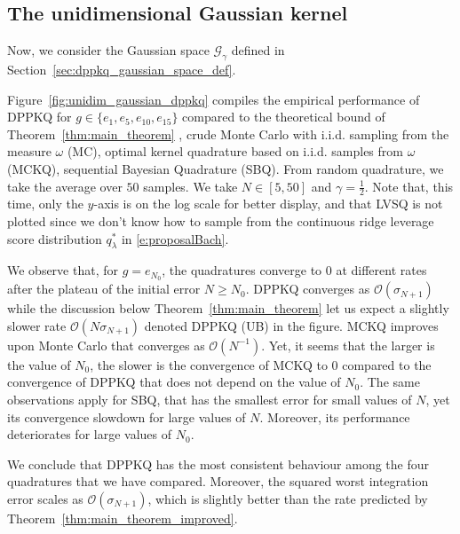 \documentclass[twoside,11pt]{book}
\numberwithin{theorem}{chapter}
\numberwithin{definition}{chapter}
\numberwithin{proposition}{chapter}
\numberwithin{corollary}{chapter}
\numberwithin{example}{chapter}
\numberwithin{lemma}{chapter}
\numberwithin{assumption}{chapter}
\numberwithin{equation}{chapter}
\numberwithin{figure}{chapter}
\newcommand{\rb}[1]{\textcolor{magenta}{#1}}
\begin{document}
\subsection{The unidimensional Gaussian kernel}\label{s:gaussian_numsim}
Now, we consider the Gaussian space $\mathcal{G}_{\gamma}$ defined in Section~\ref{sec:dppkq_gaussian_space_def}.

Figure~\ref{fig:unidim_gaussian_dppkq} compiles the empirical performance of DPPKQ for $g \in \{e_{1},e_{5},e_{10},e_{15}\}$ compared to the theoretical bound of Theorem~\ref{thm:main_theorem} , crude Monte Carlo with i.i.d. sampling from the measure $\omega$ (MC), optimal kernel quadrature based on i.i.d. samples from $\omega$ (MCKQ), sequential Bayesian Quadrature (SBQ). From random quadrature, we take the average over $50$ samples.
We take $N \in [5,50]$ and $\gamma = \frac{1}{2}$. Note that, this time, only the $y$-axis is on the log scale for better display, and that LVSQ is not plotted since we don't know how to sample from the continuous ridge leverage score distribution $q_\lambda^{*}$ in \eqref{e:proposalBach}.
%

We observe that, for $g = e_{N_{0}}$, the quadratures converge to $0$ at different rates after the plateau of the initial error $N \geq N_{0}$. DPPKQ converges as $\mathcal{O}(\sigma_{N+1})$ while the discussion below Theorem~\ref{thm:main_theorem} let us expect a slightly slower rate $\mathcal{O}(N\sigma_{N+1})$ denoted DPPKQ (UB) in the figure. MCKQ improves upon Monte Carlo that converges as $\mathcal{O}(N^{-1})$. Yet, it seems that the larger is the value of $N_0$, the slower is the convergence of MCKQ to $0$ compared to the convergence of DPPKQ that does not depend on the value of $N_0$.
 The same observations apply for SBQ, that has the smallest error for small values of $N$, yet its convergence slowdown for large values of $N$. Moreover, its performance deteriorates for large values of $N_0$.

We conclude that DPPKQ has the most consistent behaviour among the four quadratures that we have compared. Moreover, the squared worst integration error scales as $\mathcal{O}(\sigma_{N+1})$, which is slightly better than the rate predicted by Theorem~\ref{thm:main_theorem_improved}.
\end{document}
